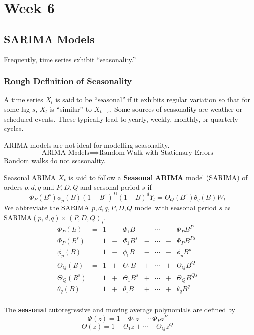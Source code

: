 \chapter{Week 6}
\section{SARIMA Models}
Frequently, time series exhibit ``seasonality.''
\subsection*{Rough Definition of Seasonality}
A time series $ X_t $ is said to be ``seasonal''
if it exhibits regular variation so that for some lag $ s $,
$ X_t $ is ``similar'' to $ X_{t-s} $.
Some sources of seasonality are weather or scheduled events.
These typically lead to yearly, weekly, monthly, or quarterly cycles.
\begin{Remark}{}{}
    ARIMA models are not ideal for modelling seasonality.
    \[ \text{ARIMA Models}\implies\text{Random Walk with Stationary Errors} \]
    Random walks do not seasonality.
\end{Remark}
\begin{Definition}{Seasonal ARIMA}{}
    $ X_t $ is said to follow a \textbf{Seasonal ARIMA} model (SARIMA)
    of orders $ p,d,q $ and $ P,D,Q $ and seasonal period $ s $
    if
    \[ \Phi_P(B^s)\phi_p(B)(1-B^s)^D(1-B)^d Y_t=\Theta_Q(B^s)\theta_q(B)W_t \]
    We abbreviate the SARIMA $ p,d,q,P,D,Q $ model with seasonal
    period $ s $ as $ \text{SARIMA}(p,d,q)\times(P,D,Q)_s $.
    \[ \begin{array}{ccccccccc}
            \Phi_P(B)     & = & 1 & - & \Phi_1 B     & - & \cdots & - & \Phi_P B^P      \\
            \Phi_P(B^s)   & = & 1 & - & \Phi_1 B^s   & - & \cdots & - & \Phi_P B^{Ps}   \\
            \phi_p(B)     & = & 1 & - & \phi_1 B     & - & \cdots & - & \phi_p B^p      \\
            \Theta_Q(B)   & = & 1 & + & \Theta_1 B   & + & \cdots & + & \Theta_Q B^Q    \\
            \Theta_Q(B^s) & = & 1 & + & \Theta_1 B^s & + & \cdots & + & \Theta_Q B^{Qs} \\
            \theta_q(B)   & = & 1 & + & \theta_1 B   & + & \cdots & + & \theta_q B^q    \\
        \end{array} \]
\end{Definition}
\begin{Definition}{}{}
    The \textbf{seasonal} autoregressive and moving average polynomials are
    defined by
    \[ \Phi(z)=1-\Phi_1 z-\cdots \Phi_P z^P \]
    \[ \Theta(z)=1+\Theta_1 z+\cdots+\Theta_Q z^Q \]
\end{Definition}
